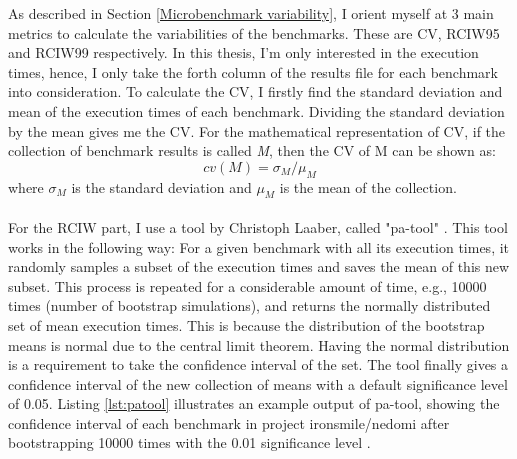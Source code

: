 \documentclass{seal_thesis}
\begin{document}
As described in Section \ref{Microbenchmark variability}, I orient myself at 3 main metrics to calculate the variabilities of the benchmarks. These are CV, RCIW95 and RCIW99 respectively. In this thesis, I'm only interested in the execution times, hence, I only take the forth column of the results file for each benchmark into consideration. To calculate the CV, I firstly find the standard deviation and mean of the execution times of each benchmark. Dividing the standard deviation by the mean gives me the CV. For the mathematical representation of CV, if the collection of benchmark results is called \textit{M}, then the CV of M can be shown as:
\[ cv(M) = \sigma _{M} / \mu _{M} \]
where $\sigma _{M}$ is the standard deviation and $\mu _{M}$ is the mean of the collection.\\
\\
For the RCIW part, I use a tool by Christoph Laaber, called "pa-tool" \cite{patool}. This tool works in the following way: For a given benchmark with all its execution times, it randomly samples a subset of the execution times and saves the mean of this new subset. This process is repeated for a considerable amount of time, e.g., 10000 times (number of bootstrap simulations), and returns the normally distributed set of mean execution times. This is because the distribution of the bootstrap means is normal due to the central limit theorem. Having the normal distribution is a requirement to take the confidence interval of the set. The tool finally gives a confidence interval of the new collection of means with a default significance level of 0.05. Listing \ref{lst:patool} illustrates an example output of pa-tool, showing the confidence interval of each benchmark in project ironsmile/nedomi after bootstrapping 10000 times with the 0.01 significance level \cite{ironsmile/nedomi}.
\end{document}
